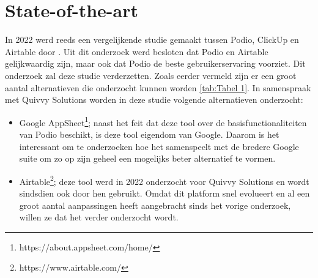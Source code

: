 
\section{State-of-the-art}%
\label{sec:state-of-the-art}


In 2022 werd reeds een vergelijkende studie gemaakt tussen Podio, ClickUp en Airtable door \textcite{Spitaels2022}. Uit dit onderzoek werd besloten dat Podio en Airtable gelijkwaardig zijn, maar ook dat Podio de beste gebruikerservaring voorziet. Dit onderzoek zal deze studie verderzetten. Zoals eerder vermeld zijn er een groot aantal alternatieven die onderzocht kunnen worden \ref{tab:Tabel 1}. In samenspraak met Quivvy Solutions worden in deze studie volgende alternatieven onderzocht:

\begin{itemize}
    \item Google AppSheet\footnote{https://about.appsheet.com/home/}; naast het feit dat deze tool over de basisfunctionaliteiten van Podio beschikt, is deze tool eigendom van Google.
     Daarom is het interessant om te onderzoeken hoe het samenspeelt met de bredere Google suite om zo op zijn geheel een mogelijks beter alternatief te vormen.
    \item Airtable\footnote{https://www.airtable.com/}; deze tool werd in 2022 onderzocht voor Quivvy Solutions en wordt sindsdien ook door hen gebruikt. Omdat dit platform snel evolueert en al een groot aantal aanpassingen heeft aangebracht sinds het vorige onderzoek, willen ze dat het verder onderzocht wordt.
\end{itemize}

